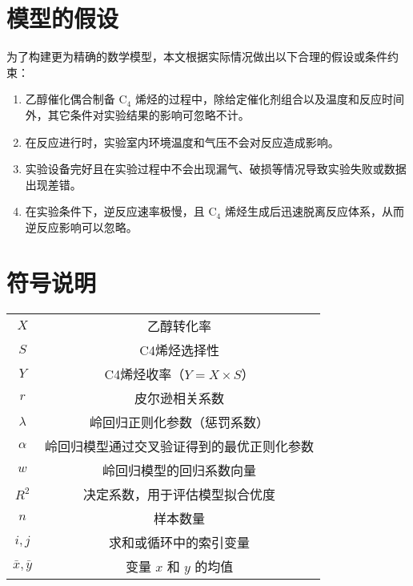 \newpage%
\section{模型的假设}
为了构建更为精确的数学模型，本文根据实际情况做出以下合理的假设或条件约束：
\begin{enumerate}
	\item 乙醇催化偶合制备 \( \text{C}_4 \) 烯烃的过程中，除给定催化剂组合以及温度和反应时间外，其它条件对实验结果的影响可忽略不计。
	\item 在反应进行时，实验室内环境温度和气压不会对反应造成影响。
	\item 实验设备完好且在实验过程中不会出现漏气、破损等情况导致实验失败或数据出现差错。
	\item 在实验条件下，逆反应速率极慢，且 \( \text{C}_4 \) 烯烃生成后迅速脱离反应体系，从而逆反应影响可以忽略。
\end{enumerate}

\section{符号说明}
\begin{table}[H] %
	\captionsetup{skip=4pt} %
	\centering
	\setlength{\arrayrulewidth}{1pt} %
	\begin{tabular}{cc} %
		\hline
		\makebox[0.15\textwidth][c]{符号} & \makebox[0.6\textwidth][c]{说明}  \\ 
		\hline
		$X$ & 乙醇转化率 \\
		$S$ & C4烯烃选择性 \\
		$Y$ & C4烯烃收率（$Y = X \times S$） \\
		$r$ & 皮尔逊相关系数 \\
		$\lambda$ & 岭回归正则化参数（惩罚系数） \\
		$\alpha$ & 岭回归模型通过交叉验证得到的最优正则化参数 \\
		$w$ & 岭回归模型的回归系数向量 \\
		$R^2$ & 决定系数，用于评估模型拟合优度 \\
		$n$ & 样本数量 \\
		$i, j$ & 求和或循环中的索引变量 \\
		$\bar{x}, \bar{y}$ & 变量 $x$ 和 $y$ 的均值 \\
		\hline
	\end{tabular}
\end{table}


